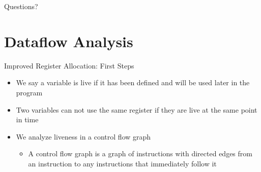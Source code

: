 \documentclass[aspectratio=169]{beamer}
\begin{document}
\begin{frame}{}
      \begin{center}
    {\color{sigma@mainblue} \LARGE Questions?}
  \end{center}
\end{frame}

\section{Dataflow Analysis}
\frame{\sectionpage}

\begin{frame}{Improved Register Allocation: First Steps}
    \begin{itemize}
        \item We say a variable is live if it has been defined and will be used later in the program
        \item Two variables can not use the same register if they are live at the same point in time
        \pause
        \item We analyze liveness in a control flow graph
        \begin{itemize}
            \item A control flow graph is a graph of instructions with directed edges from an instruction to any instructions that immediately follow it
        \end{itemize}
    \end{itemize}
    \nocite{appel}
\end{frame}
\end{document}
